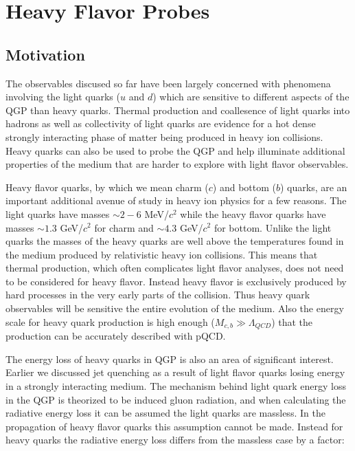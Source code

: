 \section{Heavy Flavor Probes}

\subsection{Motivation}

The observables discused so far have been largely concerned with phenomena involving the light quarks ($u$ and $d$) which are sensitive to different aspects of the QGP than heavy quarks. Thermal production and coallesence of light quarks into hadrons as well as collectivity of light quarks are evidence for a hot dense strongly interacting phase of matter being produced in heavy ion collisions. Heavy quarks can also be used to probe the QGP and help illuminate additional properties of the medium that are harder to explore with light flavor observables. 

Heavy flavor quarks, by which we mean charm ($c$) and bottom ($b$) quarks, are an important additional avenue of study in heavy ion physics for a few reasons. The light quarks have masses $\sim 2-6$ MeV/$c^2$ while the heavy flavor quarks have masses $\sim 1.3$ GeV/$c^2$ for charm and $\sim 4.3$ GeV/$c^2$ for bottom. Unlike the light quarks the masses of the heavy quarks are well above the temperatures found in the medium produced by relativistic heavy ion collisions. This means that thermal production, which often complicates light flavor analyses, does not need to be considered for heavy flavor. Instead heavy flavor is exclusively produced by hard processes in the very early parts of the collision. Thus heavy quark observables will be sensitive the entire evolution of the medium. Also the energy scale for heavy quark production is high enough ($M_{c,b} \gg \Lambda_{QCD}$) that the production can be accurately described with pQCD.

The energy loss of heavy quarks in QGP is also an area of significant interest. Earlier we discussed jet quenching as a result of light flavor quarks losing energy in a strongly interacting medium. The mechanism behind light quark energy loss in the QGP is theorized to be induced gluon radiation, and when calculating the radiative energy loss it can be assumed the light quarks are massless. In the propagation of heavy flavor quarks this assumption cannot be made. Instead for heavy quarks the radiative energy loss differs from the massless case by a factor:


